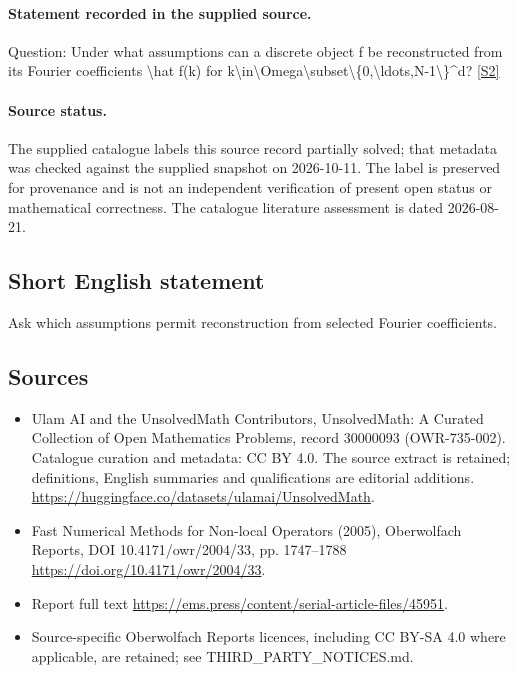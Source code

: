 \documentclass[11pt]{article}
\newcommand{\sref}[2]{\hyperlink{source:#1:#2}{[S#2]}}
\begin{document}
\paragraph{Statement recorded in the supplied source.}
Question: Under what assumptions can a discrete object f be reconstructed from its Fourier coefficients \textbackslash{}hat f(k) for k\textbackslash{}in\textbackslash{}Omega\textbackslash{}subset\textbackslash{}\{0,\textbackslash{}ldots,N-1\textbackslash{}\}\textasciicircum{}d? \sref{30000093}{2}
\paragraph{Source status.}
The supplied catalogue labels this source record partially solved; that metadata was checked against the supplied snapshot on 2026-10-11. The label is preserved for provenance and is not an independent verification of present open status or mathematical correctness. The catalogue literature assessment is dated 2026-08-21.
\subsection{Short English statement}
Ask which assumptions permit reconstruction from selected Fourier coefficients.
\subsection{Sources}
\begin{itemize}
\item[\hypertarget{source:30000093:1}{S1}] Ulam AI and the UnsolvedMath Contributors, UnsolvedMath: A Curated Collection of Open Mathematics Problems, record 30000093 (OWR-735-002). Catalogue curation and metadata: CC BY 4.0. The source extract is retained; definitions, English summaries and qualifications are editorial additions.
\url{https://huggingface.co/datasets/ulamai/UnsolvedMath}.
\item[\hypertarget{source:30000093:2}{S2}] Fast Numerical Methods for Non-local Operators (2005), Oberwolfach Reports, DOI 10.4171/owr/2004/33, pp. 1747--1788
\url{https://doi.org/10.4171/owr/2004/33}.
\item[\hypertarget{source:30000093:3}{S3}] Report full text
\url{https://ems.press/content/serial-article-files/45951}.
\item Source-specific Oberwolfach Reports licences, including CC BY-SA 4.0 where applicable, are retained; see THIRD\_PARTY\_NOTICES.md.
\end{itemize}
\end{document}
